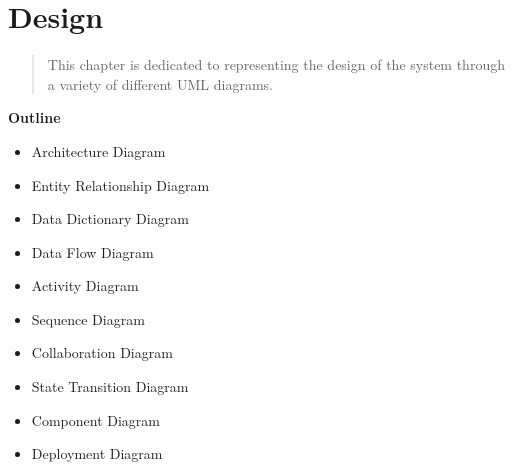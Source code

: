 
\section{Design}

\vspace{20mm}



\begin{abstract}
	
    This chapter is dedicated to representing the design of the system through a variety of different UML diagrams.
    
    
\end{abstract}

\vspace{20mm}

\large{\textbf{Outline}}

\begin{center}
    \begin{itemize}
        \item Architecture Diagram
        \item Entity Relationship Diagram
        \item Data Dictionary Diagram
        \item Data Flow Diagram
        \item Activity Diagram
        \item Sequence Diagram
        \item Collaboration Diagram
        \item State Transition Diagram
        \item Component Diagram
        \item Deployment Diagram
    \end{itemize}
\end{center}
\pagebreak

